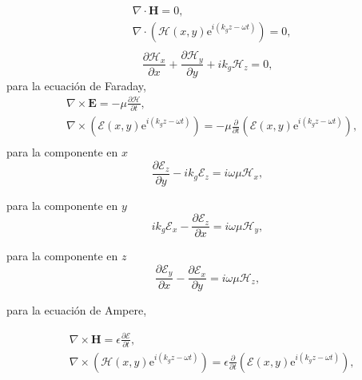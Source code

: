 \documentclass[11pt,fleqn]{book} %
\begin{document}
   \begin{equation*}
  \begin{split}
  & \nabla \cdot \textbf{H}=0,\\
  & \nabla \cdot \left( \boldsymbol{\mathcal{H}}(x,y) \text{e}^{i(k_{g}z-\omega t)} \right)=0,\\
  \end{split}
  \end{equation*}
  \begin{equation} \label{2}
  \frac{\partial \mathcal{H}_x}{\partial x}+\frac{\partial \mathcal{H}_y}{\partial y}+ik_g\mathcal{H}_z=0,
  \end{equation}
  para la ecuaci\'on de Faraday,
   \begin{equation*}
  \begin{split}
  & \nabla \times \textbf{E}=-\mu\frac{\partial \mathcal{H}}{\partial t},\\
  & \nabla \times \left( \mathcal{E} (x,y) \text{e}^{i(k_{g}z-\omega t)} \right)= -\mu\frac{\partial}{\partial t} \left( \boldsymbol{\mathcal{E}}(x,y) \text{e}^{i(k_{g}z-\omega t)} \right),\\
  \end{split}
  \end{equation*}
  para la componente en $x$
   \begin{equation} \label{3}
  \frac{\partial \mathcal{E}_z }{\partial y}-ik_g\mathcal{E}_z=i\omega\mu \mathcal{H}_{x},
  \end{equation}

  para la componente en $y$
   \begin{equation} \label{4}
  ik_g\mathcal{E}_x-\frac{\partial \mathcal{E}_z }{\partial x}=i\omega\mu \mathcal{H}_{y},
  \end{equation}

para la componente en $z$
   \begin{equation} \label{5}
  \frac{\partial \mathcal{E}_y }{\partial x}-\frac{\partial \mathcal{E}_x }{\partial y}=i\omega\mu \mathcal{H}_{z},
   \end{equation}

   para la ecuaci\'on de Ampere,

    \begin{equation*}
  \begin{split}
  & \nabla \times \textbf{H}=\epsilon\frac{\partial \mathcal{E}}{\partial t},\\
  & \nabla \times \left( \mathcal{H} (x,y) \text{e}^{i(k_{g}z-\omega t)} \right)= \epsilon\frac{\partial}{\partial t} \left( \boldsymbol{\mathcal{E}}(x,y) \text{e}^{i(k_{g}z-\omega t)} \right),\\
  \end{split}
  \end{equation*}
\end{document}
